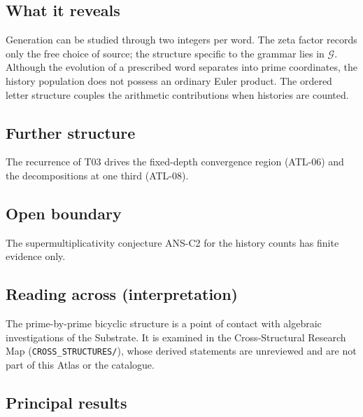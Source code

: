 \documentclass[
  11pt,
]{article}
\begin{document}
\hypertarget{what-it-reveals}{%
\subsection{What it reveals}\label{what-it-reveals}}

Generation can be studied through two integers per word. The zeta factor
records only the free choice of source; the structure specific to the
grammar lies in \(\mathcal G\). Although the evolution of a prescribed
word separates into prime coordinates, the history population does not
possess an ordinary Euler product. The ordered letter structure couples
the arithmetic contributions when histories are counted.

\hypertarget{further-structure}{%
\subsection{Further structure}\label{further-structure}}

The recurrence of T03 drives the fixed-depth convergence region (ATL-06)
and the decompositions at one third (ATL-08).

\hypertarget{open-boundary}{%
\subsection{Open boundary}\label{open-boundary}}

The supermultiplicativity conjecture ANS-C2 for the history counts has
finite evidence only.

\hypertarget{reading-across-interpretation}{%
\subsection{Reading across
(interpretation)}\label{reading-across-interpretation}}

The prime-by-prime bicyclic structure is a point of contact with
algebraic investigations of the Substrate. It is examined in the
Cross-Structural Research Map (\texttt{CROSS\_STRUCTURES/}), whose
derived statements are unreviewed and are not part of this Atlas or the
catalogue.

\hypertarget{principal-results}{%
\subsection{Principal results}\label{principal-results}}
\end{document}
